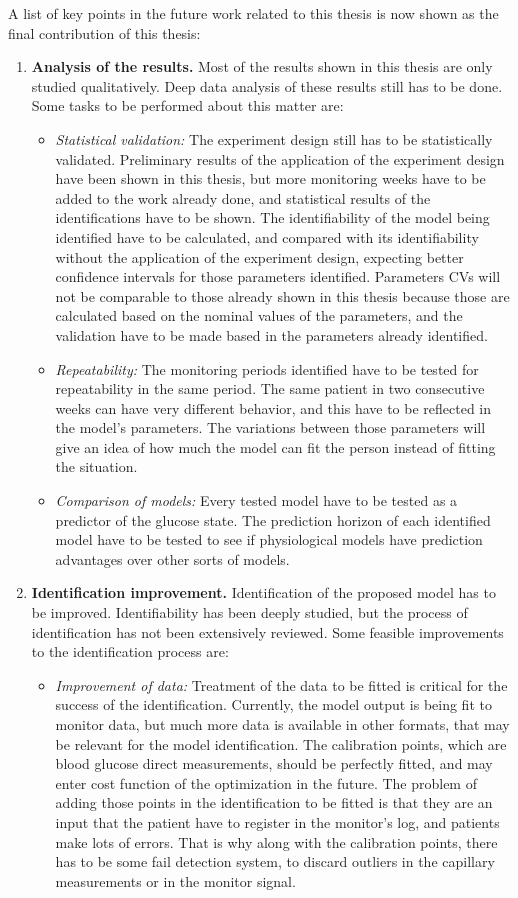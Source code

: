 A list of key points in the future work related to this thesis is now shown as the final contribution of this thesis:
\begin{enumerate}
	\item \textbf{Analysis of the results.} Most of the results shown in this thesis are only studied qualitatively. Deep data analysis of these results still has to be done. Some tasks to be performed about this matter are:
	\begin{itemize}
		\item \textit{Statistical validation:} The experiment design still has to be statistically validated. Preliminary results of the application of the experiment design have been shown in this thesis, but more monitoring weeks have to be added to the work already done, and statistical results of the identifications have to be shown. The identifiability of the model being identified have to be calculated, and compared with its identifiability without the application of the experiment design, expecting better confidence intervals for those parameters identified. Parameters CVs will not be comparable to those already shown in this thesis because those are calculated based on the nominal values of the parameters, and the validation have to be made based in the parameters already identified.
		\item \textit{Repeatability:} The monitoring periods identified have to be tested for repeatability in the same period. The same patient in two consecutive weeks can have very different behavior, and this have to be reflected in the model's parameters. The variations between those parameters will give an idea of how much the model can fit the person instead of fitting the situation.
		\item \textit{Comparison of models:} Every tested model have to be tested as a predictor of the glucose state. The prediction horizon of each identified model have to be tested to see if physiological models have prediction advantages over other sorts of models.
	\end{itemize}
	\item \textbf{Identification improvement.} Identification of the proposed model has to be improved. Identifiability has been deeply studied, but the process of identification has not been extensively reviewed. Some feasible improvements to the identification process are:
	\begin{itemize}
		\item \textit{Improvement of data:} Treatment of the data to be fitted is critical for the success of the identification. Currently, the model output is being fit to monitor data, but much more data is available in other formats, that may be relevant for the model identification. The calibration points, which are blood glucose direct measurements, should be perfectly fitted, and may enter cost function of the optimization in the future. The problem of adding those points in the identification to be fitted is that they are an input that the patient have to register in the monitor's log, and patients make lots of errors. That is why along with the calibration points, there has to be some fail detection system, to discard outliers in the capillary measurements or in the monitor signal.

\end{itemize}
\end{enumerate}

